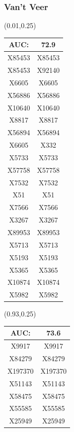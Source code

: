 \documentclass{beamer}
\begin{document}
\begin{frame}[plain]
  \frametitle{Van't Veer}
  \begin{textblock*}{\paperwidth}(0.01\textwidth,0.25\textheight)
    \raggedright 
    \tiny
    \begin{tabular}{| c c |}
      \hline
AUC: & 72.9 \\ \hline \hline
X85453  &  X85453 \\ \hline 
X85453  &  X92140 \\ \hline 
X6605  &  X6605 \\ \hline 
X56886  &  X56886 \\ \hline 
X10640  &  X10640 \\ \hline 
X8817  &  X8817 \\ \hline 
X56894  &  X56894 \\ \hline 
X6605  &  X332 \\ \hline 
X5733  &  X5733 \\ \hline 
X57758  &  X57758 \\ \hline 
X7532  &  X7532 \\ \hline 
X51  &  X51 \\ \hline 
X7566  &  X7566 \\ \hline 
X3267  &  X3267 \\ \hline 
X89953  &  X89953 \\ \hline 
X5713  &  X5713 \\ \hline 
X5193  &  X5193 \\ \hline 
X5365  &  X5365 \\ \hline 
X10874  &  X10874 \\ \hline 
X5982  &  X5982 \\ \hline 
    \end{tabular}
    \hspace{.5em}
  \end{textblock*}
  \begin{textblock*}{\paperwidth}(0.93\textwidth,0.25\textheight)
    \raggedright 
    \tiny
    \begin{tabular}{| c c |}
      \hline
AUC: & 73.6 \\ \hline \hline
X9917  &  X9917 \\ \hline 
X84279  &  X84279 \\ \hline 
X197370  &  X197370 \\ \hline 
X51143  &  X51143 \\ \hline 
X58475  &  X58475 \\ \hline 
X55585  &  X55585 \\ \hline 
X25949  &  X25949 \\ \hline 

\end{tabular}
\end{textblock*}
\end{frame}
\end{document}
